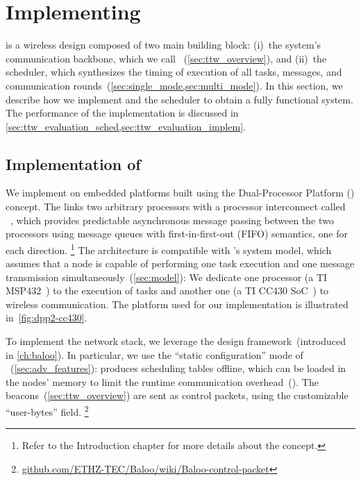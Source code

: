 
\section{Implementing \TTW}
\label{sec:ttw_implementation}

\TTW is a wireless \CPS design composed of two main building block:\linebreak
(i)~the system's communication backbone, which we call \TTnet ~(\cref{sec:ttw_overview}), and
(ii)~the \TTW scheduler, which synthesizes the timing of execution of all tasks, messages, and communication rounds~(\cref{sec:single_mode,sec:multi_mode}).
In this section, we describe how we implement \TTnet and the \TTW scheduler to obtain a fully functional \TTW system.
The performance of the implementation is discussed in \cref{sec:ttw_evaluation_sched,sec:ttw_evaluation_implem}.

\subsection{Implementation of \TTnet}
\label{subsec:implem_ttnet}

We implement \TTnet on embedded platforms built using the Dual-Processor Platform (\DPP) concept.
The \DPP links two arbitrary processors with a processor interconnect called \bolt~\cite{sutton2015Bolt}, which provides predictable asynchronous message passing between the two processors using message queues with first-in-first-out (FIFO) semantics, one for each direction.%
%
\footnote{Refer to the Introduction chapter for more details about the \DPP concept.}
%
The \DPP architecture is compatible with \TTW's system model, which assumes that a node is capable of performing one task execution and one message transmission simultaneously~(\cref{sec:model}):
We dedicate one processor (a TI MSP432~\cite{msp432}) to the execution of tasks and another one (a TI CC430 SoC~\cite{CC430F6137}) to wireless communication.
The \DPP platform used for our implementation is illustrated in~\cref{fig:dpp2-cc430}.

To implement the \TTnet network stack, we leverage the \baloo design framework~(introduced in \cref{ch:baloo}).
In particular, we use the ``static configuration'' mode of \baloo~(\cref{sec:adv_features}):
\TTW produces scheduling tables offline, which can be loaded in the nodes' memory to limit the runtime communication overhead~().
The \TTnet beacons~(\cref{sec:ttw_overview}) are sent as \baloo control packets, using the customizable ``user-bytes'' field.%
%
\footnote{\href{https://github.com/ETHZ-TEC/Baloo/wiki/Baloo-control-packet}{github.com/ETHZ-TEC/Baloo/wiki/Baloo-control-packet}}


